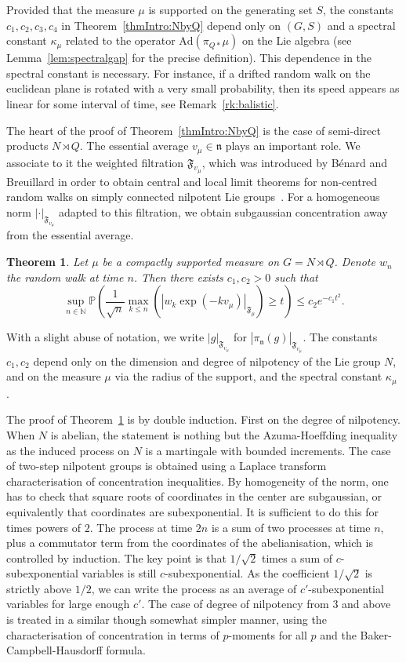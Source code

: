 \documentclass[11pt,leqno]{article}
\theoremstyle{plain}
\newtheorem{theorem}{Theorem}[section]
\theoremstyle{definition}
\theoremstyle{remark}
\numberwithin{equation}{section}
\newcommand{\Ad}{\mathrm{Ad}}
\begin{document}
Provided that the measure $\mu$ is supported on the generating set $S$, the constants $c_1,c_2,c_3,c_4$ in Theorem~\ref{thmIntro:NbyQ} depend only on $(G,S)$ and a spectral constant $\kappa_\mu$ related to the operator $\Ad(\pi_{Q\ast} \mu)$ on the Lie algebra (see Lemma~\ref{lem:spectralgap} for the precise definition). This dependence in the spectral constant is necessary. For instance, if a drifted random walk on the euclidean plane is rotated with a very small probability, then its speed appears as linear for some interval of time, see Remark~\ref{rk:balistic}.

 The heart of the proof of Theorem~\ref{thmIntro:NbyQ} is the case of semi-direct products $N\rtimes Q$. The essential average $v_\mu \in \mathfrak{n}$ plays an important role. We associate to it the weighted filtration $\mathfrak{F}_{v_\mu}$, which was introduced by Bénard and Breuillard in order to obtain central and local limit theorems for non-centred random walks on simply connected nilpotent Lie groups~\cite{BeBr23,BeBr25}. For a homogeneous norm $|\cdot|_{\mathfrak{F}_{v_\mu}}$ adapted  to this filtration, we obtain subgaussian concentration away from the essential average.
 
 \begin{theorem}\label{thm:normIntro}
 Let $\mu$ be a compactly supported measure on $G=N \rtimes Q$. Denote $w_n$ the random walk at time $n$. Then there exists $c_1,c_2>0$ such that
\[
\sup_{n\in \mathbb{N}} \mathbb{P} \left( \frac{1}{\sqrt{n}}\max_{k\le n}\left(\left|w_k\exp\left(-kv_{\mu}\right)\right|_{\mathfrak{F}_\mu}\right) \ge t\right) \le c_2e^{-c_1t^2}.
\]
 \end{theorem}

With a slight abuse of notation, we write $|g|_{\mathfrak{F}_{v_\mu}}$ for $|\pi_{\mathfrak{n}}(g)|_{\mathfrak{F}_{v_\mu}}$. The constants $c_1,c_2$ depend only on the dimension and degree of nilpotency of the Lie group $N$, and on the measure $\mu$ via  the radius of the support, and the spectral constant $\kappa_\mu$ .

The proof of Theorem~\ref{thm:normIntro} is by double induction. First on the degree of nilpotency. When $N$ is abelian, the statement is nothing but the Azuma-Hoeffding inequality as the induced process on $N$ is a martingale with bounded increments. The case of two-step nilpotent groups is obtained using a Laplace transform characterisation of concentration inequalities. By homogeneity of the norm, one has to check that square roots of coordinates in the center are subgaussian, or equivalently that coordinates are subexponential. It is sufficient to do this for times powers of $2$. The process at time $2n$ is a sum of two processes at time $n$, plus a commutator term from the coordinates of the abelianisation, which is controlled by induction. The key point is that $1/\sqrt{2}$ times a sum of $c$-subexponential variables is still $c$-subexponential. As the coefficient $1/\sqrt{2}$ is strictly above $1/2$, we can write the process as an average of $c'$-subexponential variables for large enough $c'$. The case of degree of nilpotency from $3$ and above is treated in a similar though somewhat simpler manner, using the characterisation of concentration in terms of $p$-moments for all $p$ and the Baker-Campbell-Hausdorff formula.
\end{document}
